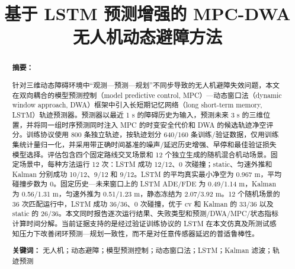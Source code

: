 \documentclass[10pt,a4paper,twocolumn]{ctexart}
\title{基于 LSTM 预测增强的 MPC-DWA 无人机动态避障方法}
\author{}
\date{}
\begin{document}
\maketitle
\begin{abstract}
\noindent\textbf{摘要：}

针对三维动态障碍环境中“观测—预测—规划”不同步导致的无人机避障失效问题，本文在双向耦合的模型预测控制（model predictive control, MPC）—动态窗口法（dynamic window approach, DWA）框架中引入长短期记忆网络（long short-term memory, LSTM）轨迹预测器。预测器以最近 1 s 的障碍历史为输入，预测未来 3 s 的三维位置，并将同一组时序预测同时注入 MPC 的时变安全代价和 DWA 的候选轨迹净空评分。训练协议使用 800 条独立轨迹，按轨迹划分 640/160 条训练/验证数据，仅用训练集统计量归一化，并采用带正确时间基准的噪声/延迟历史增强、早停和最佳验证损失模型选择。评估包含四个固定路线交叉场景和 12 个独立生成的随机混合机动场景。固定场景中，每种方法运行 12 次：LSTM 成功 12/12、0 次碰撞；static、匀速外推和 Kalman 分别成功 10/12、9/12 和 9/12。LSTM 的平均真实最小净空为 0.967 m，平均碰撞步数为 0。固定历史—未来窗口上的 LSTM ADE/FDE 为 0.49/1.14 m，Kalman 为 0.56/1.31 m，匀速外推为 0.51/1.23 m，静态冻结为 2.07/3.92 m。12 个随机场景的 36 次匹配运行中，LSTM 成功 36/36、0 次碰撞，优于 cv 和 Kalman 的 33/36 以及 static 的 26/36。本文同时报告逐次运行结果、失败类型和预测/DWA/MPC/状态指标计算时间分解。当前证据支持的是经过验证训练协议的 LSTM 在本文仿真及所测试感知压力下改善闭环预测—规划一致性，而不是对任意传感器延迟的普适鲁棒性。

\noindent\textbf{关键词：} 无人机；动态避障；模型预测控制；动态窗口法；LSTM；Kalman 滤波；轨迹预测

\end{abstract}
\end{document}
